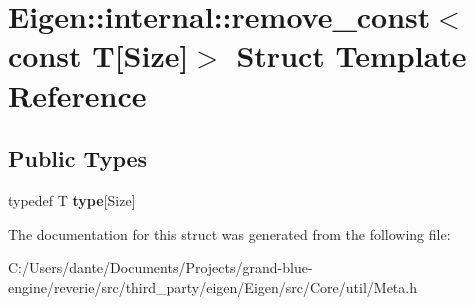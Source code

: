 \hypertarget{struct_eigen_1_1internal_1_1remove__const_3_01const_01_t[_size]_4}{}\section{Eigen\+::internal\+::remove\+\_\+const$<$ const T\mbox{[}Size\mbox{]}$>$ Struct Template Reference}
\label{struct_eigen_1_1internal_1_1remove__const_3_01const_01_t[_size]_4}
\subsection*{Public Types}
\begin{DoxyCompactItemize}
\item 
\mbox{\label{struct_eigen_1_1internal_1_1remove__const_3_01const_01_t[_size]_4_ac07fc7701793f86e7a94f7e11e84af6e}} 
typedef T {\bfseries type}\mbox{[}Size\mbox{]}
\end{DoxyCompactItemize}


The documentation for this struct was generated from the following file\+:\begin{DoxyCompactItemize}
\item 
C\+:/\+Users/dante/\+Documents/\+Projects/grand-\/blue-\/engine/reverie/src/third\+\_\+party/eigen/\+Eigen/src/\+Core/util/Meta.\+h\end{DoxyCompactItemize}
